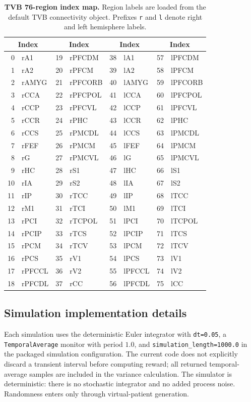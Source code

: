 \documentclass{article}
\begin{document}
\begin{table}[t]
  \centering
  \scriptsize
  \caption{\textbf{TVB 76-region index map.} Region labels are loaded from the default TVB connectivity object. Prefixes \texttt{r} and \texttt{l} denote right and left hemisphere labels.}
  \label{tab:regionmap}
  \begin{tabular}{r@{\ }l r@{\ }l r@{\ }l r@{\ }l}
    \toprule
    \multicolumn{2}{c}{Index} & \multicolumn{2}{c}{Index} & \multicolumn{2}{c}{Index} & \multicolumn{2}{c}{Index} \\
    \midrule
    0 & rA1 & 19 & rPFCDM & 38 & lA1 & 57 & lPFCDM \\
    1 & rA2 & 20 & rPFCM & 39 & lA2 & 58 & lPFCM \\
    2 & rAMYG & 21 & rPFCORB & 40 & lAMYG & 59 & lPFCORB \\
    3 & rCCA & 22 & rPFCPOL & 41 & lCCA & 60 & lPFCPOL \\
    4 & rCCP & 23 & rPFCVL & 42 & lCCP & 61 & lPFCVL \\
    5 & rCCR & 24 & rPHC & 43 & lCCR & 62 & lPHC \\
    6 & rCCS & 25 & rPMCDL & 44 & lCCS & 63 & lPMCDL \\
    7 & rFEF & 26 & rPMCM & 45 & lFEF & 64 & lPMCM \\
    8 & rG & 27 & rPMCVL & 46 & lG & 65 & lPMCVL \\
    9 & rHC & 28 & rS1 & 47 & lHC & 66 & lS1 \\
    10 & rIA & 29 & rS2 & 48 & lIA & 67 & lS2 \\
    11 & rIP & 30 & rTCC & 49 & lIP & 68 & lTCC \\
    12 & rM1 & 31 & rTCI & 50 & lM1 & 69 & lTCI \\
    13 & rPCI & 32 & rTCPOL & 51 & lPCI & 70 & lTCPOL \\
    14 & rPCIP & 33 & rTCS & 52 & lPCIP & 71 & lTCS \\
    15 & rPCM & 34 & rTCV & 53 & lPCM & 72 & lTCV \\
    16 & rPCS & 35 & rV1 & 54 & lPCS & 73 & lV1 \\
    17 & rPFCCL & 36 & rV2 & 55 & lPFCCL & 74 & lV2 \\
    18 & rPFCDL & 37 & rCC & 56 & lPFCDL & 75 & lCC \\
    \bottomrule
  \end{tabular}
\end{table}

\subsection{Simulation implementation details}
Each simulation uses the deterministic Euler integrator with \texttt{dt=0.05}, a \texttt{TemporalAverage} monitor with period $1.0$, and \texttt{simulation\_length=1000.0} in the packaged simulation configuration. The current code does not explicitly discard a transient interval before computing reward; all returned temporal-average samples are included in the variance calculation. The simulator is deterministic: there is no stochastic integrator and no added process noise. Randomness enters only through virtual-patient generation.
\end{document}
